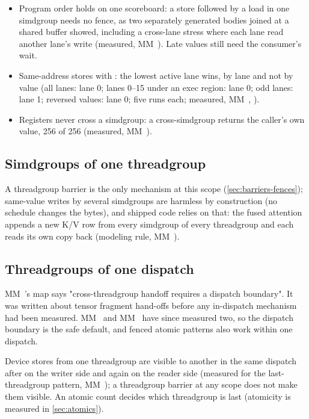 \begin{itemize}
\item Program order holds on one scoreboard: a store followed by a load in one simdgroup needs no fence, as two separately
  generated bodies joined at a shared buffer showed, including a cross-lane stress where each lane read another lane's
  write (measured, MM~). Late values still need the consumer's wait.
\item Same-address stores with : the lowest active lane wins, by lane and not by value (all
  lanes: lane 0; lanes 0--15 under an exec region: lane 0; odd lanes: lane 1; reversed values: lane 0; five runs each;
  measured, MM~, ).
\item Registers never cross a simdgroup: a cross-simdgroup  returns the caller's own value, 256 of 256
  (measured, MM~).
\end{itemize}

\subsection*{Simdgroups of one threadgroup}

A threadgroup barrier is the only mechanism at this scope (\cref{sec:barriers-fences}); same-value writes by
several simdgroups are harmless by construction (no schedule changes the bytes), and shipped code relies on that: the fused attention appends a
new K/V row from every simdgroup of every threadgroup and each reads its own copy back (modeling rule, MM~).

\subsection*{Threadgroups of one dispatch}

MM~'s map says "cross-threadgroup handoff requires a
dispatch boundary". It was written about tensor fragment hand-offs before any in-dispatch mechanism had been measured.
MM~ and MM~ have since measured two, so the dispatch boundary is the safe default, and fenced
atomic patterns also work within one dispatch.

Device stores from one threadgroup are visible to another in the same dispatch after  on the writer side and
again on the reader side (measured for the last-threadgroup pattern, MM~); a threadgroup barrier at any
scope does not make them visible. An atomic count decides which threadgroup is last (atomicity is measured in
\cref{sec:atomics}).

